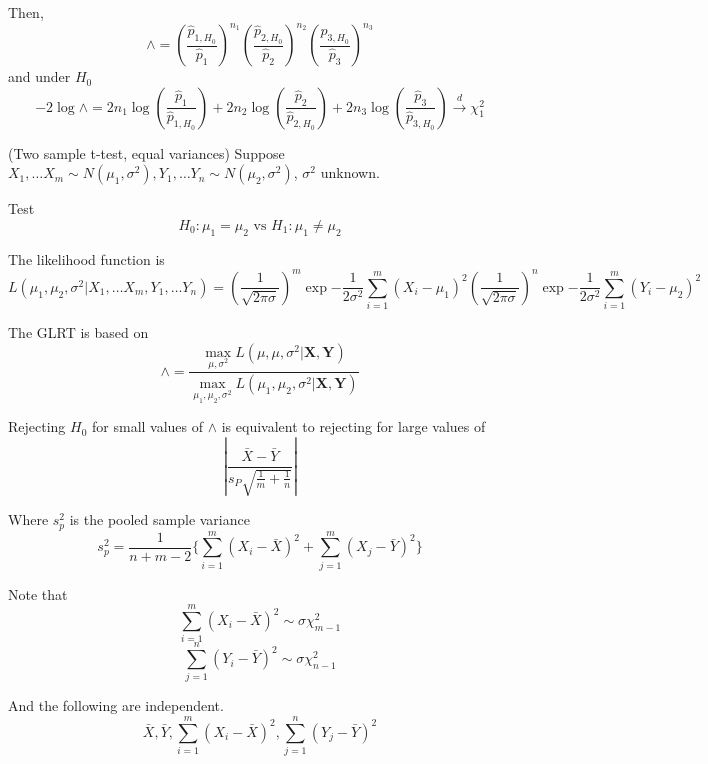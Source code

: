 \begin{example}
    Then, 
    \[
    \wedge = \left( \frac{\hat{p}_{1, H_0}}{\hat{p}_1} \right)^{n_1}
            \left( \frac{\hat{p}_{2, H_0}}{\hat{p}_2} \right)^{n_2}
            \left( \frac{\hat{p}_{3, H_0}}{\hat{p}_3} \right)^{n_3}
    \]
    and under $H_0$
    \[
        -2 \log \wedge = 
        2n_1 \log \left( \frac{\hat{p}_1}{\hat{p}_{1, H_0}} \right)  + 
        2n_2 \log \left( \frac{\hat{p}_2}{\hat{p}_{2, H_0}} \right)  + 
        2n_3 \log \left( \frac{\hat{p}_3}{\hat{p}_{3, H_0}} \right)  \overset{d}{\longrightarrow} \chi_1^2
    \]
    
     
\end{example}

\begin{example} (Two sample t-test, equal variances)
    Suppose $X_1, \hdots X_m \sim N(\mu_1, \sigma^2), Y_1, \hdots Y_n \sim N(\mu_2, \sigma^2)$, $\sigma^2$ unknown. 

    Test 
    \[
        H_0: \mu_1 = \mu_2 \text{ vs } H_1: \mu_1 \neq \mu_2
    \]

    The likelihood function is 
    \[
        L(\mu_1, \mu_2, \sigma^2 | X_1, \hdots X_m, Y_1, \hdots Y_n) = 
        \left( \frac{1}{\sqrt{2 \pi \sigma} } \right)^m \exp{
            -\frac{1}{2 \sigma^2}
            \sum\limits_{i = 1}^{m}  (X_i - \mu_1)^2
        }
        \left( \frac{1}{\sqrt{2 \pi \sigma} } \right)^n \exp{
            -\frac{1}{2 \sigma^2}
            \sum\limits_{i = 1}^{m}  (Y_i - \mu_2)^2
        }
    \]

    The GLRT is based on 
    \[
        \wedge = \frac{
            \max_{\mu, \sigma^2} L(\mu, \mu, \sigma^2 | \bm{X}, \bm{Y})
        }{
            \max_{\mu_1, \mu_2, \sigma^2} L(\mu_1, \mu_2, \sigma^2 | \bm{X}, \bm{Y})
        }
    \]

    Rejecting $H_0$ for small values of $\wedge$ is equivalent to rejecting for large values of 
    \[
        \left| \frac{\bar{X} - \bar{Y} }{s_P \sqrt{ \frac{1}{m} + \frac{1}{n}}} \right| 
    \]

    Where $s_p^2$ is the pooled sample variance
    \[
        s_p^2 = \frac{1}{n + m - 2} \{ \sum\limits_{i = 1}^{m} (X_i - \bar{X} )^2 + \sum\limits_{j = 1}^{m} (X_j - \bar{Y} )^2 \} 
    \]

    Note that 
    \[
        \sum\limits_{i = 1}^{m} (X_i - \bar{X} )^2 \sim \sigma \chi_{m - 1}^2
    \]
    \[
        \sum\limits_{j = 1}^{n} (Y_i - \bar{Y} )^2 \sim \sigma \chi_{n - 1}^2
    \]

    And the following are independent.
    \[
        \bar{X} , \bar{Y} , \sum\limits_{i =1}^{m} (X_i - \bar{X} )^2, \sum\limits_{j = 1}^{n} (Y_j - \bar{Y} )^2
    \]


\end{example}
